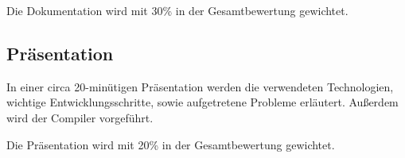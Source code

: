 Die Dokumentation wird mit 30\% in der Gesamtbewertung gewichtet.

\subsection{Präsentation}
In einer circa 20-minütigen Präsentation werden die verwendeten Technologien, wichtige Entwicklungsschritte, sowie aufgetretene Probleme erläutert. Außerdem wird der Compiler vorgeführt. 

Die Präsentation wird mit 20\% in der Gesamtbewertung gewichtet.
